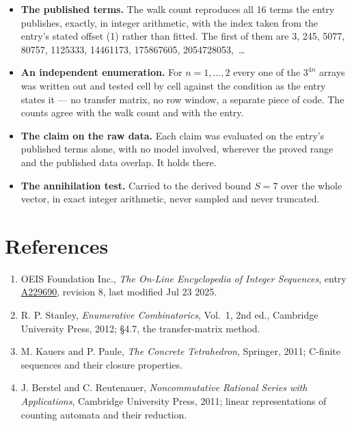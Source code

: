 \documentclass[11pt]{article}
\theoremstyle{definition}
\begin{document}
\begin{itemize}

\item {\bfseries The published terms.} The walk count reproduces all 16 terms the entry publishes, exactly, in integer arithmetic, with the index taken from the entry's stated offset (1) rather than fitted. The first of them are 3, 245, 5077, 80757, 1125333, 14461173, 175867605, 2054728053,~\dots

\item {\bfseries An independent enumeration.} For $n = 1,\dots,2$ every one of the $3^{4n}$ arrays was written out and tested cell by cell against the condition as the entry states it --- no transfer matrix, no row window, a separate piece of code. The counts agree with the walk count and with the entry.

\item {\bfseries The claim on the raw data.} Each claim was evaluated on the entry's published terms alone, with no model involved, wherever the proved range and the published data overlap. It holds there.

\item {\bfseries The annihilation test.} Carried to the derived bound $S = 7$ over the whole vector, in exact integer arithmetic, never sampled and never truncated.

\end{itemize}

\section{References}

\begin{enumerate}

\item OEIS Foundation Inc., \emph{The On-Line Encyclopedia of Integer Sequences}, entry \href{https://oeis.org/A229690}{A229690}, revision 8, last modified Jul 23 2025.

\item R. P. Stanley, \emph{Enumerative Combinatorics}, Vol.~1, 2nd ed., Cambridge University Press, 2012; \S4.7, the transfer-matrix method.

\item M. Kauers and P. Paule, \emph{The Concrete Tetrahedron}, Springer, 2011; C-finite sequences and their closure properties.

\item J. Berstel and C. Reutenauer, \emph{Noncommutative Rational Series with Applications}, Cambridge University Press, 2011; linear representations of counting automata and their reduction.

\end{enumerate}
\end{document}
